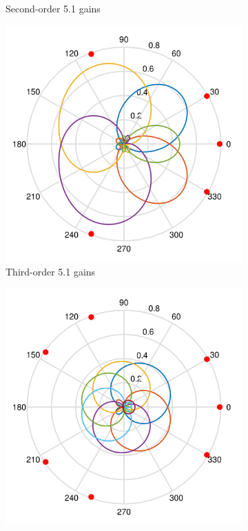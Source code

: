 \documentclass[12pt]{report}
\begin{document}
\begin{figure}[tbp]
\begin{subfigure}{0.32\textwidth}
    \caption{\centering Second-order 5.1 gains}
  \end{subfigure}
  \hfill
    \begin{subfigure}{0.32\textwidth}
    \includegraphics[width=\linewidth]{figures/ldspkGains_5p0_o3.png}
    \caption{\centering Third-order 5.1 gains}
  \end{subfigure}
  \newline
  \begin{subfigure}{0.32\textwidth}
    \includegraphics[width=\linewidth]{figures/ldspkGains_7p0_o1.png}

\end{subfigure}
\end{figure}
\end{document}
